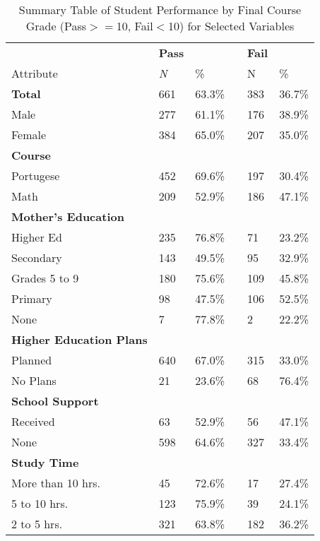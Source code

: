\documentclass[sigconf]{acmart}
\begin{document}
 
\begin{table}
  \caption{Summary Table of Student Performance by Final Course Grade 
  (Pass$>=$10, Fail$<$10) for Selected Variables}
  \label{tab:freq}
  \begin{tabular}{llllll}
    \toprule
                    &  \textbf{Pass} & & & \textbf{Fail} & \\
    Attribute & \textit{N} & \% &  & N & \% \\
    \midrule
    \textbf{Total}  & 661 & 63.3\% & & 383 & 36.7\% \\
    \midrule
    Male            & 277 & 61.1\% & & 176 & 38.9\%  \\
    Female          & 384 & 65.0\% & & 207 & 35.0\%  \\
    \midrule
    \textbf{Course} &  &  &  &  & \\
    Portugese       & 452 & 69.6\% & & 197 & 30.4\%  \\
    Math            & 209 & 52.9\% & & 186 & 47.1\%  \\  
    \midrule
    \textbf{Mother's Education} &  &  &  &  & \\
    Higher Ed       & 235 & 76.8\% & &  71 & 23.2\% \\
    Secondary       & 143 & 49.5\% & &  95 & 32.9\% \\
    Grades 5 to 9   & 180 & 75.6\% & & 109 & 45.8\% \\
    Primary         &  98 & 47.5\% & & 106 & 52.5\% \\
    None            &   7 & 77.8\% & &   2 & 22.2\% \\
    \midrule   
    \textbf{Higher Education Plans} &  &  &  &  & \\
    Planned         & 640 & 67.0\% & & 315 & 33.0\%  \\
    No Plans        &  21 & 23.6\% & &  68 & 76.4\%  \\
    \midrule
    \textbf{School Support} &  &  &  &  & \\
    Received        &  63 & 52.9\% & &  56 & 47.1\%  \\
    None            & 598 & 64.6\% & & 327 & 33.4\%  \\ 
    \midrule    
    \textbf{Study Time} &   &  &  &  &     \\
    More than 10 hrs. &  45 & 72.6\% & &  17 & 27.4\% \\
    5 to 10 hrs.      & 123 & 75.9\% & &  39 & 24.1\% \\
    2 to 5 hrs.       & 321 & 63.8\% & & 182 & 36.2\% \\    

\end{tabular}
\end{table}
\end{document}
